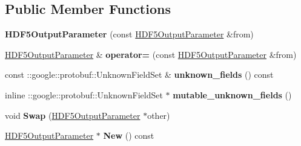 \subsection*{Public Member Functions}
\begin{DoxyCompactItemize}
\item 
\mbox{\label{classcaffe_1_1_h_d_f5_output_parameter_a0af90c542a7dce28b533fc4b2cba9aba}} 
{\bfseries H\+D\+F5\+Output\+Parameter} (const \mbox{\hyperlink{classcaffe_1_1_h_d_f5_output_parameter}{H\+D\+F5\+Output\+Parameter}} \&from)
\item 
\mbox{\label{classcaffe_1_1_h_d_f5_output_parameter_a1ea21af01a48be2cbd506b4dc7128396}} 
\mbox{\hyperlink{classcaffe_1_1_h_d_f5_output_parameter}{H\+D\+F5\+Output\+Parameter}} \& {\bfseries operator=} (const \mbox{\hyperlink{classcaffe_1_1_h_d_f5_output_parameter}{H\+D\+F5\+Output\+Parameter}} \&from)
\item 
\mbox{\label{classcaffe_1_1_h_d_f5_output_parameter_a99f44fadf75119df4eb30f61a6f1511f}} 
const \+::google\+::protobuf\+::\+Unknown\+Field\+Set \& {\bfseries unknown\+\_\+fields} () const
\item 
\mbox{\label{classcaffe_1_1_h_d_f5_output_parameter_a32460cf98a8be171c31f93c4a822a17a}} 
inline \+::google\+::protobuf\+::\+Unknown\+Field\+Set $\ast$ {\bfseries mutable\+\_\+unknown\+\_\+fields} ()
\item 
\mbox{\label{classcaffe_1_1_h_d_f5_output_parameter_acb46004129812ea27e90a42a7e90612f}} 
void {\bfseries Swap} (\mbox{\hyperlink{classcaffe_1_1_h_d_f5_output_parameter}{H\+D\+F5\+Output\+Parameter}} $\ast$other)
\item 
\mbox{\label{classcaffe_1_1_h_d_f5_output_parameter_a4199e6ad67f0c16090b59734d9b33a8d}} 
\mbox{\hyperlink{classcaffe_1_1_h_d_f5_output_parameter}{H\+D\+F5\+Output\+Parameter}} $\ast$ {\bfseries New} () const
\item 
\mbox{\label{classcaffe_1_1_h_d_f5_output_parameter_a82975052e4eaf03817423d6419560f6b}} 

\end{DoxyCompactItemize}
